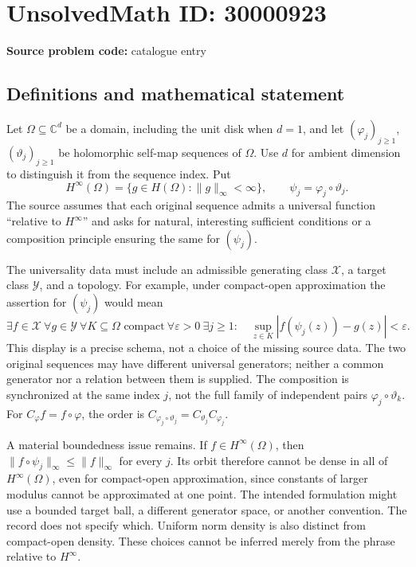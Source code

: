 \documentclass[11pt]{article}
\newcommand{\C}{\mathbb{C}}
\begin{document}
\section*{UnsolvedMath ID: 30000923}
\textbf{Source problem code:} catalogue entry
\subsection{Definitions and mathematical statement}
Let \(\Omega\subseteq\C^d\) be a domain, including the unit disk when \(d=1\), and let \((\varphi_j)_{j\geq1}\), \((\vartheta_j)_{j\geq1}\) be holomorphic self-map sequences of \(\Omega\). Use \(d\) for ambient dimension to distinguish it from the sequence index. Put
\[
 H^\infty(\Omega)=\{g\in H(\Omega):\|g\|_\infty<\infty\},\qquad
 \psi_j=\varphi_j\circ\vartheta_j.
\]
The source assumes that each original sequence admits a universal function ``relative to \(H^\infty\)'' and asks for natural, interesting sufficient conditions or a composition principle ensuring the same for \((\psi_j)\).

The universality data must include an admissible generating class \(\mathcal X\), a target class \(\mathcal Y\), and a topology. For example, under compact-open approximation the assertion for \((\psi_j)\) would mean
\[
 \exists f\in\mathcal X\ \forall g\in\mathcal Y\ \forall K\subseteq\Omega
 \text{ compact}\ \forall\varepsilon>0\ \exists j\geq1:\quad
 \sup_{z\in K}|f(\psi_j(z))-g(z)|<\varepsilon.
\]
This display is a precise schema, not a choice of the missing source data. The two original sequences may have different universal generators; neither a common generator nor a relation between them is supplied. The composition is synchronized at the same index \(j\), not the full family of independent pairs \(\varphi_j\circ\vartheta_k\). For \(C_\varphi f=f\circ\varphi\), the order is \(C_{\varphi_j\circ\vartheta_j}=C_{\vartheta_j}C_{\varphi_j}\).

A material boundedness issue remains. If \(f\in H^\infty(\Omega)\), then \(\|f\circ\psi_j\|_\infty\leq\|f\|_\infty\) for every \(j\). Its orbit therefore cannot be dense in all of \(H^\infty(\Omega)\), even for compact-open approximation, since constants of larger modulus cannot be approximated at one point. The intended formulation might use a bounded target ball, a different generator space, or another convention. The record does not specify which. Uniform norm density is also distinct from compact-open density. These choices cannot be inferred merely from the phrase relative to \(H^\infty\).
\end{document}

